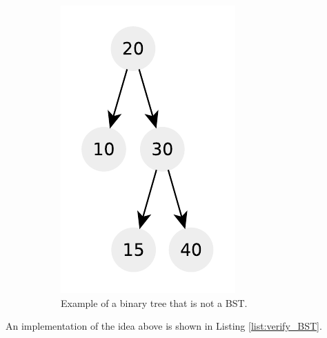 \begin{figure}
\begin{subfigure}[t]{0.35\textwidth}
		\includegraphics[width=1\linewidth]{sources/verify_BST/images/no_BST}
		\caption{Example of a binary tree that is not a BST.}
		\label{ex:verify_BST:no_BST}
	 \end{subfigure}
	 \caption[]{}
	  \label{fig:verify:trees_ranges_generic}
\end{figure}




An implementation of the idea above is shown in Listing \ref{list:verify_BST}. 



